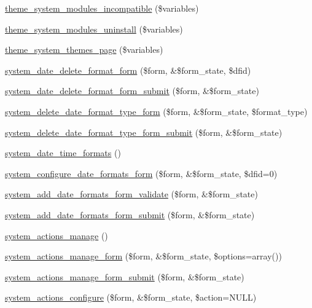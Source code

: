 \begin{DoxyCompactItemize}
\item 
\hyperlink{group__themeable_ga2b92c41a106a88c6adea84fc06bfeb55}{theme\_\-system\_\-modules\_\-incompatible} (\$variables)
\item 
\hyperlink{group__themeable_ga9128d4735bfebfb459217e0b10d4400c}{theme\_\-system\_\-modules\_\-uninstall} (\$variables)
\item 
\hyperlink{group__themeable_gaea95a9176e04f5ad0707f3adfc59efa6}{theme\_\-system\_\-themes\_\-page} (\$variables)
\item 
\hyperlink{system_8admin_8inc_a336db528b424fdd470e363fe80b77fa1}{system\_\-date\_\-delete\_\-format\_\-form} (\$form, \&\$form\_\-state, \$dfid)
\item 
\hyperlink{system_8admin_8inc_a8eb5f9af75f1ac4f9b96a305f032c29e}{system\_\-date\_\-delete\_\-format\_\-form\_\-submit} (\$form, \&\$form\_\-state)
\item 
\hyperlink{system_8admin_8inc_af3ae6c701b15a83518c2aa5ada9a5f5d}{system\_\-delete\_\-date\_\-format\_\-type\_\-form} (\$form, \&\$form\_\-state, \$format\_\-type)
\item 
\hyperlink{system_8admin_8inc_af8f1dc0f2dda0917fc8b8e03d81f3979}{system\_\-delete\_\-date\_\-format\_\-type\_\-form\_\-submit} (\$form, \&\$form\_\-state)
\item 
\hyperlink{system_8admin_8inc_aa6407c07ce1ab0298615d4e31e61cc5f}{system\_\-date\_\-time\_\-formats} ()
\item 
\hyperlink{system_8admin_8inc_ac48dbb97434713ff9953f3338fe5dbb0}{system\_\-configure\_\-date\_\-formats\_\-form} (\$form, \&\$form\_\-state, \$dfid=0)
\item 
\hyperlink{system_8admin_8inc_a5f6ba1a50bf018a1218b2d42eca5ce06}{system\_\-add\_\-date\_\-formats\_\-form\_\-validate} (\$form, \&\$form\_\-state)
\item 
\hyperlink{system_8admin_8inc_a4da8cb843f179d159b7183d2eb37d8d3}{system\_\-add\_\-date\_\-formats\_\-form\_\-submit} (\$form, \&\$form\_\-state)
\item 
\hyperlink{system_8admin_8inc_a362aac908fa612bb62c015acc11e308e}{system\_\-actions\_\-manage} ()
\item 
\hyperlink{group__forms_gaa4836604ff53f110b7305b227cfb6344}{system\_\-actions\_\-manage\_\-form} (\$form, \&\$form\_\-state, \$options=array())
\item 
\hyperlink{system_8admin_8inc_ab37cd97a32a3723e9af59094d1141951}{system\_\-actions\_\-manage\_\-form\_\-submit} (\$form, \&\$form\_\-state)
\item 
\hyperlink{system_8admin_8inc_aff0321246e1c42aab7d73b899065c45d}{system\_\-actions\_\-configure} (\$form, \&\$form\_\-state, \$action=NULL)

\end{DoxyCompactItemize}
